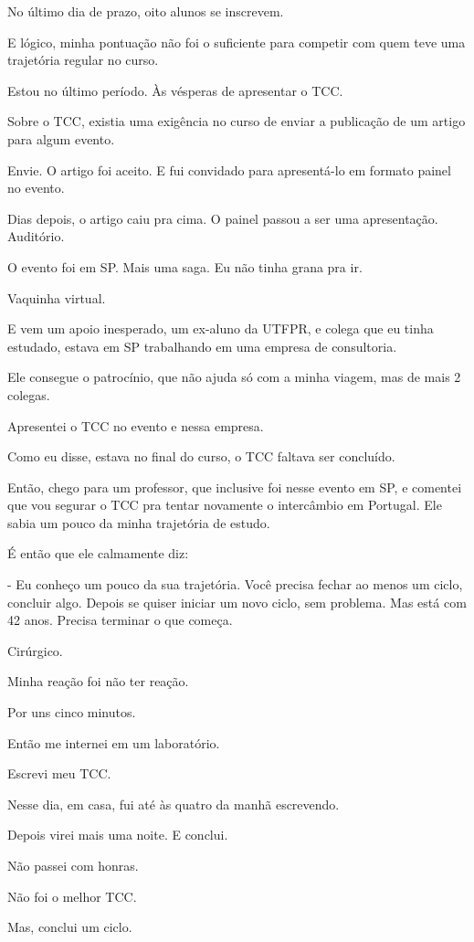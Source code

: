 No último dia de prazo, oito alunos se inscrevem.

E lógico, minha pontuação não foi o suficiente para competir com quem teve uma trajetória regular no curso.

Estou no último período. Às vésperas de apresentar o TCC.

Sobre o TCC, existia uma exigência no curso de enviar a publicação de um artigo para algum evento. 

Envie. O artigo foi aceito. E fui convidado para apresentá-lo em formato painel no evento.

Dias depois, o artigo caiu pra cima. O painel passou a ser uma apresentação. Auditório.

O evento foi em SP. Mais uma saga. Eu não tinha grana pra ir.

Vaquinha virtual.

E vem um apoio inesperado, um ex-aluno da UTFPR, e colega que eu tinha estudado, estava em SP trabalhando em uma empresa de consultoria.

Ele consegue o patrocínio, que não ajuda só com a minha viagem, mas de mais 2 colegas. 

Apresentei o TCC no evento e nessa empresa.

Como eu disse, estava no final do curso, o TCC faltava ser concluído.

Então, chego para um professor, que inclusive foi nesse evento em SP, e comentei que vou segurar o TCC pra tentar novamente o intercâmbio em Portugal. Ele sabia um pouco da minha trajetória de estudo.

É então que ele calmamente diz:

- Eu conheço um pouco da sua trajetória. Você precisa fechar ao menos um ciclo, concluir algo. Depois se quiser iniciar um  novo ciclo, sem problema. Mas está com 42 anos. Precisa terminar o que começa.

Cirúrgico.

Minha reação foi não ter reação. 

Por uns cinco minutos.

Então me internei em um laboratório. 

Escrevi meu TCC.

Nesse dia, em casa, fui até às quatro da manhã escrevendo.

Depois virei mais uma noite. 
E conclui.

Não passei com honras. 

Não foi o melhor TCC. 

Mas, conclui um ciclo.